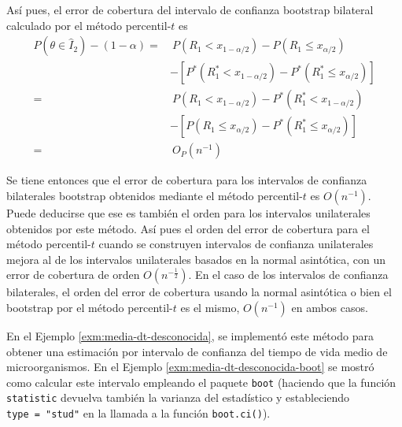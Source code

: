 \documentclass[
]{book}
\theoremstyle{break}
\theoremstyle{nonumberplain}
\begin{document}
Así pues, el error de cobertura del intervalo de confianza bootstrap
bilateral calculado por el método percentil-\(t\) es
\[\begin{aligned}
P\left( \theta \in \hat{I}_2 \right) -\left( 1-\alpha \right) =&\  P\left(
R_1<x_{1-\alpha /2} \right) -P\left( R_1\leq x_{\alpha /2} \right) \\
& -\left[ P^{\ast}\left( R_1^{\ast}<x_{1-\alpha /2} \right) -P^{\ast
}\left( R_1^{\ast}\leq x_{\alpha /2} \right) \right] \\
=&\  P\left( R_1<x_{1-\alpha /2} \right) -P^{\ast}\left( R_1^{\ast
}<x_{1-\alpha /2} \right) \\
&-\left[ P\left( R_1\leq x_{\alpha /2} \right) -P^{\ast}\left(
R_1^{\ast}\leq x_{\alpha /2} \right) \right] \\
=&\  O_{P}\left( n^{-1} \right)
\end{aligned}\]

Se tiene entonces que el error de cobertura para los intervalos de
confianza bilaterales bootstrap obtenidos mediante el método
percentil-\(t\) es
\(O\left( n^{-1} \right)\). Puede deducirse que ese es también el orden
para los intervalos unilaterales obtenidos por este método. Así pues el
orden del error de cobertura para el método percentil-\(t\) cuando se
construyen intervalos de confianza unilaterales mejora al de los
intervalos unilaterales basados en la normal asintótica, con un error de
cobertura de orden \(O\left( n^{-\frac{1}{2}} \right)\). En el caso de los
intervalos de confianza bilaterales, el orden del error de cobertura
usando la normal asintótica o bien el bootstrap por el método
percentil-\(t\) es el mismo, \(O\left( n^{-1} \right)\) en ambos casos.

En el Ejemplo \ref{exm:media-dt-desconocida}, se implementó
este método para obtener una estimación por intervalo de confianza
del tiempo de vida medio de microorganismos.
En el Ejemplo \ref{exm:media-dt-desconocida-boot} se mostró como
calcular este intervalo empleando el paquete \texttt{boot} (haciendo que
la función \texttt{statistic} devuelva también la varianza del estadístico
y estableciendo \texttt{type\ =\ "stud"} en la llamada a la función \texttt{boot.ci()}).
\end{document}

